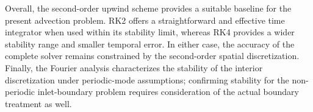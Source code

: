 Overall, the second-order upwind scheme provides a suitable baseline for the present advection problem. RK2 offers a straightforward and effective time integrator when used within its stability limit, whereas RK4 provides a wider stability range and smaller temporal error. In either case, the accuracy of the complete solver remains constrained by the second-order spatial discretization. Finally, the Fourier analysis characterizes the stability of the interior discretization under periodic-mode assumptions; confirming stability for the non-periodic inlet-boundary problem requires consideration of the actual boundary treatment as well.
